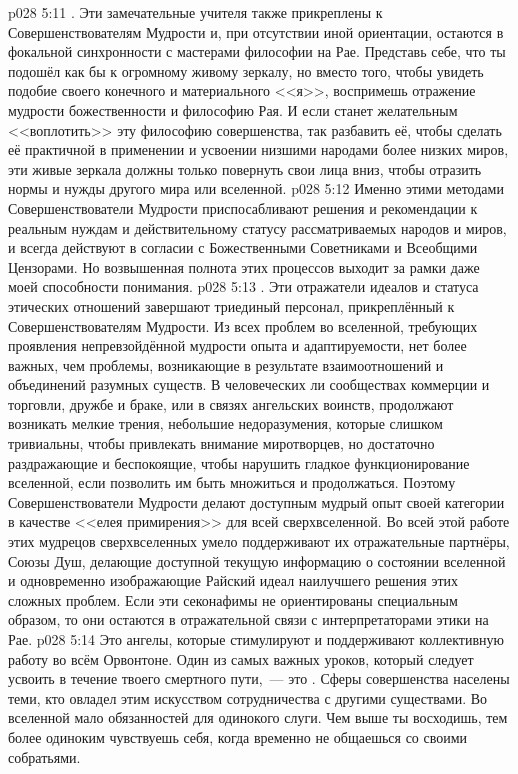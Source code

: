 \vs p028 5:11 . Эти замечательные учителя также прикреплены к Совершенствователям Мудрости и, при отсутствии иной ориентации, остаются в фокальной синхронности с мастерами философии на Рае. Представь себе, что ты подошёл как бы к огромному живому зеркалу, но вместо того, чтобы увидеть подобие своего конечного и материального <<я>>, воспримешь отражение мудрости божественности и философию Рая. И если станет желательным <<воплотить>> эту философию совершенства, так разбавить её, чтобы сделать её практичной в применении и усвоении низшими народами более низких миров, эти живые зеркала должны только повернуть свои лица вниз, чтобы отразить нормы и нужды другого мира или вселенной.
\vs p028 5:12 Именно этими методами Совершенствователи Мудрости приспосабливают решения и рекомендации к реальным нуждам и действительному статусу рассматриваемых народов и миров, и всегда действуют в согласии с Божественными Советниками и Всеобщими Цензорами. Но возвышенная полнота этих процессов выходит за рамки даже моей способности понимания.
\vs p028 5:13 . Эти отражатели идеалов и статуса этических отношений завершают триединый персонал, прикреплённый к Совершенствователям Мудрости. Из всех проблем во вселенной, требующих проявления непревзойдённой мудрости опыта и адаптируемости, нет более важных, чем проблемы, возникающие в результате взаимоотношений и объединений разумных существ. В человеческих ли сообществах коммерции и торговли, дружбе и браке, или в связях ангельских воинств, продолжают возникать мелкие трения, небольшие недоразумения, которые слишком тривиальны, чтобы привлекать внимание миротворцев, но достаточно раздражающие и беспокоящие, чтобы нарушить гладкое функционирование вселенной, если позволить им быть множиться и продолжаться. Поэтому Совершенствователи Мудрости делают доступным мудрый опыт своей категории в качестве <<елея примирения>> для всей сверхвселенной. Во всей этой работе этих мудрецов сверхвселенных умело поддерживают их отражательные партнёры, Союзы Душ, делающие доступной текущую информацию о состоянии вселенной и одновременно изображающие Райский идеал наилучшего решения этих сложных проблем. Если эти секонафимы не ориентированы специальным образом, то они остаются в отражательной связи с интерпретаторами этики на Рае.
\vs p028 5:14 \pc Это ангелы, которые стимулируют и поддерживают коллективную работу во всём Орвонтоне. Один из самых важных уроков, который следует усвоить в течение твоего смертного пути,~--- это . Сферы совершенства населены теми, кто овладел этим искусством сотрудничества с другими существами. Во вселенной мало обязанностей для одинокого слуги. Чем выше ты восходишь, тем более одиноким чувствуешь себя, когда временно не общаешься со своими собратьями.
